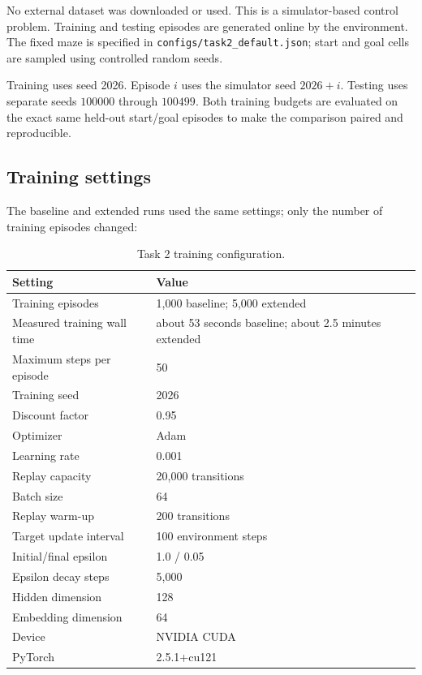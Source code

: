 \documentclass[11pt,a4paper]{article}
\begin{document}
No external dataset was downloaded or used. This is a simulator-based control
problem. Training and testing episodes are generated online by the environment.
The fixed maze is specified in \texttt{configs/task2\_default.json}; start and
goal cells are sampled using controlled random seeds.

Training uses seed 2026. Episode $i$ uses the simulator seed $2026+i$. Testing
uses separate seeds $100000$ through $100499$. Both training budgets are
evaluated on the exact same held-out start/goal episodes to make the comparison
paired and reproducible.

\subsection{Training settings}

The baseline and extended runs used the same settings; only the number of
training episodes changed:
\begin{table}[h]
\centering
\caption{Task 2 training configuration.}
\begin{tabular}{ll}
\toprule
Setting & Value\\
\midrule
Training episodes & 1,000 baseline; 5,000 extended\\
Measured training wall time & about 53 seconds baseline; about 2.5 minutes extended\\
Maximum steps per episode & 50\\
Training seed & 2026\\
Discount factor & 0.95\\
Optimizer & Adam\\
Learning rate & 0.001\\
Replay capacity & 20,000 transitions\\
Batch size & 64\\
Replay warm-up & 200 transitions\\
Target update interval & 100 environment steps\\
Initial/final epsilon & 1.0 / 0.05\\
Epsilon decay steps & 5,000\\
Hidden dimension & 128\\
Embedding dimension & 64\\
Device & NVIDIA CUDA\\
PyTorch & 2.5.1+cu121\\
\bottomrule
\end{tabular}
\end{table}
\end{document}
